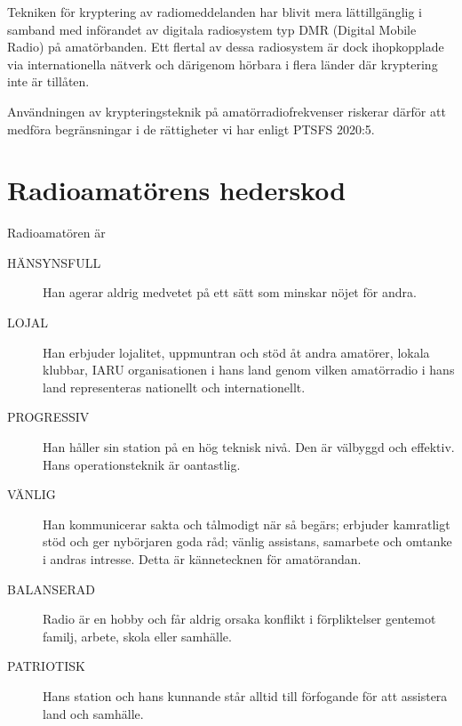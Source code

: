Tekniken för kryptering av radiomeddelanden har blivit mera lättillgänglig i
samband med införandet av digitala radiosystem typ DMR (Digital Mobile Radio) på
amatörbanden.
Ett flertal av dessa radiosystem är dock ihopkopplade via internationella
nätverk och därigenom hörbara i flera länder där kryptering inte är tillåten.

Användningen av krypteringsteknik på amatörradiofrekvenser riskerar därför att
medföra begränsningar i de rättigheter vi har enligt PTSFS 2020:5.

\newpage %
\section[Hederskod]{Radioamatörens hederskod}

Radioamatören är

\begin{description}
  \item[HÄNSYNSFULL] Han agerar aldrig medvetet på ett sätt som minskar nöjet för andra.

  \item[LOJAL] Han erbjuder lojalitet, uppmuntran och stöd åt andra amatörer, lokala klubbar,
    IARU organisationen i hans land genom vilken amatörradio i hans land
    representeras nationellt och internationellt.

  \item[PROGRESSIV] Han håller sin station på en hög teknisk nivå. Den är välbyggd och effektiv.
    Hans operationsteknik är oantastlig.

  \item[VÄNLIG] Han kommunicerar sakta och tålmodigt när så begärs; erbjuder kamratligt stöd och ger nybörjaren goda råd; vänlig assistans, samarbete och omtanke i andras intresse. Detta är kännetecknen för amatörandan.

  \item[BALANSERAD] Radio är en hobby och får aldrig orsaka konflikt i förpliktelser gentemot
    familj, arbete, skola eller samhälle.

  \item[PATRIOTISK] Hans station och hans kunnande står alltid till förfogande för att
    assistera land och samhälle.
\end{description}

  
